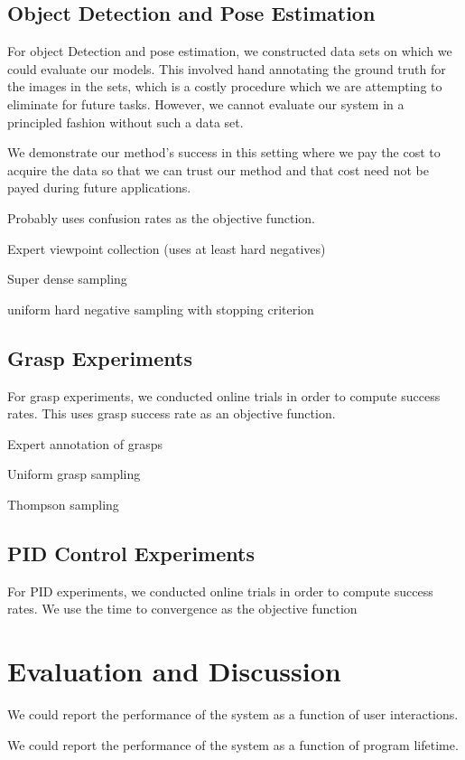 \documentclass[conference]{IEEEtran}
\begin{document}
\subsection{Object Detection and Pose Estimation}
For object Detection and pose estimation, we constructed data
sets on which we could evaluate our models. This involved hand
annotating the ground truth for the images in the sets, which is a
costly procedure which we are attempting to eliminate for future tasks.
However, we cannot evaluate our system in a principled fashion without such
a data set.

We demonstrate our method's success in this setting where we pay the cost
to acquire the data so that we can trust our method and that cost need not be 
payed during future applications. 

Probably uses confusion rates as the objective function.

Expert viewpoint collection (uses at least hard negatives)

Super dense sampling

uniform hard negative sampling with stopping criterion

\subsection{Grasp Experiments}
For grasp experiments, we conducted online trials in order to compute success rates.
This uses grasp success rate as an objective function.

Expert annotation of grasps

Uniform grasp sampling

Thompson sampling

\subsection{PID Control Experiments}
For PID experiments, we conducted online trials in order to compute success rates.
We use the time to convergence as the objective function




\section{Evaluation and Discussion}
We could report the performance of the system as a function of user interactions.

We could report the performance of the system as a function of program lifetime.
\end{document}
